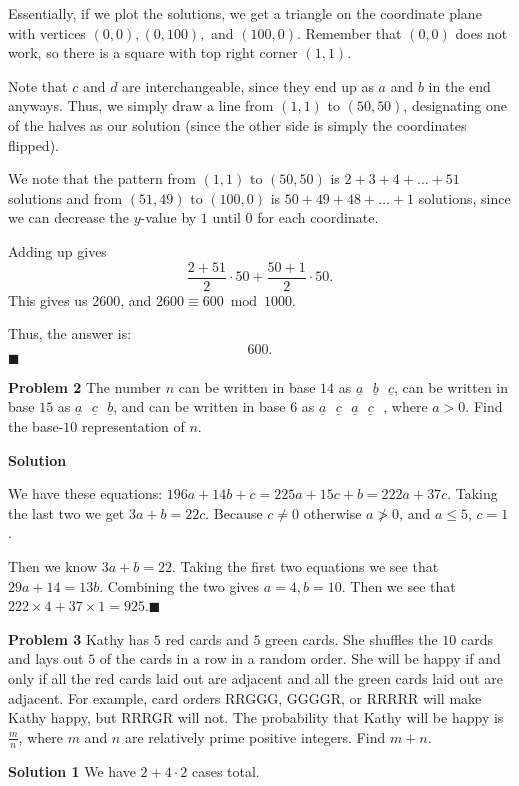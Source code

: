\documentclass[a4paper,11pt]{article}
\begin{document}
Essentially, if we plot the solutions, we get a triangle on the coordinate plane with vertices $(0,0), (0, 100),$ and $(100,0)$. Remember that $(0,0)$ does not work, so there is a square with top right corner $(1,1)$.

Note that $c$ and $d$ are interchangeable, since they end up as $a$ and $b$ in the end anyways. Thus, we simply draw a line from $(1,1)$ to $(50,50)$, designating one of the halves as our solution (since the other side is simply the coordinates flipped).

We note that the pattern from $(1,1)$ to $(50,50)$ is $2+3+4+\dots+51$ solutions and from $(51, 49)$ to $(100,0)$ is $50+49+48+\dots+1$ solutions, since we can decrease the $y$-value by $1$ until $0$ for each coordinate.

Adding up gives \[\dfrac{2+51}{2}\cdot 50+\dfrac{50+1}{2}\cdot 50.\] This gives us $2600$, and $2600\equiv 600 \bmod{1000}.$

Thus, the answer is: \[\boxed{600}.\] $\blacksquare$


\textbf{Problem 2}
The number $n$ can be written in base $14$ as $\underline{a}\text{ }\underline{b}\text{ }\underline{c}$, can be written in base $15$ as $\underline{a}\text{ }\underline{c}\text{ }\underline{b}$, and can be written in base $6$ as $\underline{a}\text{ }\underline{c}\text{ }\underline{a}\text{ }\underline{c}\text{ }$, where $a > 0$. Find the base-$10$ representation of $n$.

\textbf{Solution}

We have these equations: $196a+14b+c=225a+15c+b=222a+37c$. Taking the last two we get $3a+b=22c$. Because $c \neq 0$ otherwise $a \ngtr 0$, and $a \leq 5$, $c=1$.

Then we know $3a+b=22$. Taking the first two equations we see that $29a+14=13b$. Combining the two gives $a=4, b=10$. Then we see that $222 \times 4+37 \times1=\boxed{925}$.\hfill $\blacksquare$

\textbf{Problem 3}
Kathy has $5$ red cards and $5$ green cards. She shuffles the $10$ cards and lays out $5$ of the cards in a row in a random order. She will be happy if and only if all the red cards laid out are adjacent and all the green cards laid out are adjacent. For example, card orders RRGGG, GGGGR, or RRRRR will make Kathy happy, but RRRGR will not. The probability that Kathy will be happy is $\frac{m}{n}$, where $m$ and $n$ are relatively prime positive integers. Find $m + n$.

\textbf{Solution 1}
We have $2+4\cdot 2$ cases total.
\end{document}
